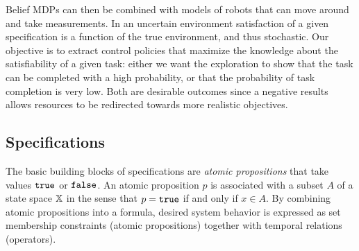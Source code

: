 \documentclass[conference]{IEEEtran}
\begin{document}
Belief MDPs can then be combined with models of robots that can move around and take measurements. In an uncertain environment satisfaction of a given specification is a function of the true environment, and thus stochastic. Our objective is to extract control policies that maximize the knowledge about the satisfiability of a given task: either we want the exploration to show that the task can be completed with a high probability, or that the probability of task completion is very low. Both are desirable outcomes since a negative results allows resources to be redirected towards more realistic objectives.  

\subsection{Specifications}

The basic building blocks of specifications are \emph{atomic propositions} that take values $\texttt{true}$ or $\texttt{false}$. An atomic proposition $p$ is associated with a subset $A$ of a state space $\mathbb{X}$ in the sense that $p = \texttt{true}$ if and only if $x \in A$. By combining atomic propositions into a formula, desired system behavior is expressed as set membership constraints (atomic propositions) together with temporal relations (operators).
\end{document}
